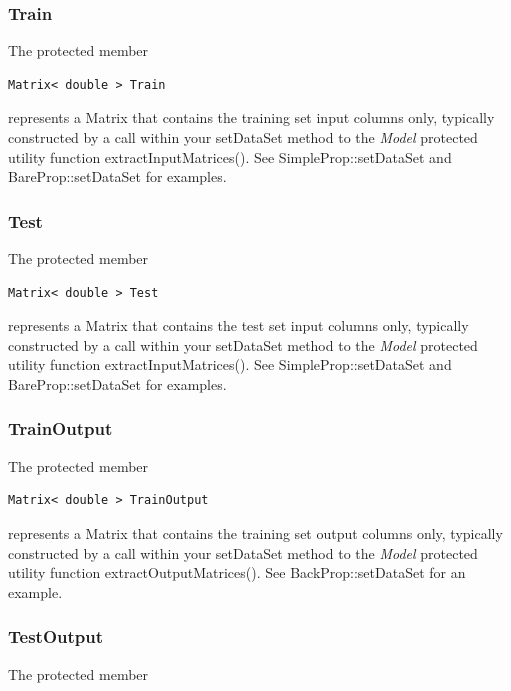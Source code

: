 \documentclass{report}
\begin{document}
\subsubsection{Train}

The protected member

\begin{verbatim}
Matrix< double > Train
\end{verbatim}

represents a Matrix that contains the training set input columns only,
typically constructed by a call within your setDataSet method to the
{\em Model} protected utility function extractInputMatrices().  See
SimpleProp::setDataSet and BareProp::setDataSet for examples.

\subsubsection{Test}

The protected member

\begin{verbatim}
Matrix< double > Test
\end{verbatim}

represents a Matrix that contains the test set input columns only,
typically constructed by a call within your setDataSet method to the
{\em Model} protected utility function extractInputMatrices().  See
SimpleProp::setDataSet and BareProp::setDataSet for examples.

\subsubsection{TrainOutput}

The protected member

\begin{verbatim}
Matrix< double > TrainOutput
\end{verbatim}

represents a Matrix that contains the training set output columns
only, typically constructed by a call within your setDataSet method to
the {\em Model} protected utility function extractOutputMatrices().
See BackProp::setDataSet for an example.

\subsubsection{TestOutput}

The protected member
\end{document}
